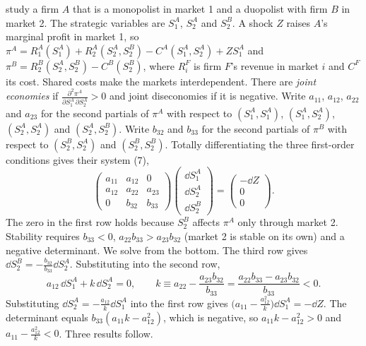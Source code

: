 \begin{example}\label{ex:B-bgk}
\citet[pp.~492--495]{BulowGeanakoplosKlemperer1985} study a firm $A$ that is a monopolist in market 1 and a duopolist
with firm $B$ in market 2. The strategic variables are $S_1^A$, $S_2^A$ and $S_2^B$. A shock $Z$ raises $A$'s marginal
profit in market 1, so $\pi^A = R_1^A(S_1^A) + R_2^A(S_2^A, S_2^B) - C^A(S_1^A, S_2^A) + ZS_1^A$ and
$\pi^B = R_2^B(S_2^A, S_2^B) - C^B(S_2^B)$, where $R_i^F$ is firm $F$'s revenue in market $i$ and $C^F$ its cost.
Shared costs make the markets interdependent. There are \emph{joint
economies} if $\frac{\partial^2\pi^A}{\partial S_1^A\,\partial S_2^A} > 0$ and joint diseconomies if it is negative. Write
$a_{11}$, $a_{12}$, $a_{22}$ and $a_{23}$ for the second partials of $\pi^A$ with respect to $(S_1^A, S_1^A)$,
$(S_1^A, S_2^A)$, $(S_2^A, S_2^A)$ and $(S_2^A, S_2^B)$. Write $b_{32}$ and $b_{33}$ for the second partials of $\pi^B$
with respect to $(S_2^B, S_2^A)$ and $(S_2^B, S_2^B)$. Totally differentiating the three first-order conditions gives their system
(7),
\[
  \begin{pmatrix} a_{11} & a_{12} & 0\\ a_{12} & a_{22} & a_{23}\\ 0 & b_{32} & b_{33}\end{pmatrix}
  \begin{pmatrix} \dd S_1^A\\ \dd S_2^A\\ \dd S_2^B\end{pmatrix}
  = \begin{pmatrix} -\dd Z\\ 0\\ 0\end{pmatrix}.
\]
The zero in the first row holds because $S_2^B$ affects $\pi^A$ only through market 2. Stability requires
$b_{33} < 0$, $a_{22}b_{33} > a_{23}b_{32}$ (market 2 is stable on its own) and a negative determinant. We solve from the
bottom. The third row gives $\dd S_2^B = -\frac{b_{32}}{b_{33}}\dd S_2^A$. Substituting into the second row,
\[
  a_{12}\,\dd S_1^A + k\,\dd S_2^A = 0, \qquad k \equiv a_{22} - \frac{a_{23}b_{32}}{b_{33}} = \frac{a_{22}b_{33} - a_{23}b_{32}}{b_{33}} < 0.
\]
Substituting $\dd S_2^A = -\frac{a_{12}}{k}\dd S_1^A$ into the first row gives
$\bigl(a_{11} - \frac{a_{12}^2}{k}\bigr)\dd S_1^A = -\dd Z$. The determinant equals $b_{33}(a_{11}k - a_{12}^2)$, which is
negative, so $a_{11}k - a_{12}^2 > 0$ and $a_{11} - \frac{a_{12}^2}{k} < 0$. Three results follow.

\end{example}
